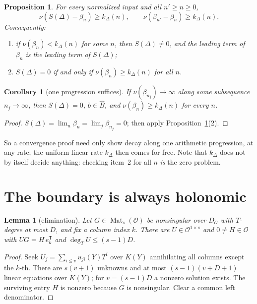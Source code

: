 \documentclass[11pt,a4paper]{article}
\newcommand{\Op}{\mathcal O}
\newcommand{\Bhat}{\widehat B}
\newcommand{\Dop}{D_{\Op}}
\newcommand{\val}{\nu}
\newcommand{\Mat}{\operatorname{Mat}}
\theoremstyle{plain}
\newtheorem{proposition}[theorem]{Proposition}
\newtheorem{lemma}[theorem]{Lemma}
\newtheorem{corollary}[theorem]{Corollary}
\theoremstyle{definition}
\theoremstyle{remark}
\begin{document}
\begin{proposition}\label{prop:rate}
For every normalized input and all $n'\ge n\ge0$,
\[
  \val(S(\Delta)-\beta_n)\ge k_\Delta(n),\qquad \val(\beta_{n'}-\beta_n)\ge k_\Delta(n).
\]
Consequently:
\begin{enumerate}
\item if $\val(\beta_n)<k_\Delta(n)$ for some $n$, then $S(\Delta)\ne0$, and the
  leading term of $\beta_n$ is the leading term of $S(\Delta)$;
\item $S(\Delta)=0$ if and only if $\val(\beta_n)\ge k_\Delta(n)$ for all $n$.
\end{enumerate}
\end{proposition}

\begin{corollary}[one progression suffices]\label{cor:progression}
If $\val(\beta_{n_j})\to\infty$ along some subsequence $n_j\to\infty$, then
$S(\Delta)=0$, $b\in\Bhat$, and $\val(\beta_n)\ge k_\Delta(n)$ for every $n$.
\end{corollary}
\begin{proof}
$S(\Delta)=\lim_n\beta_n=\lim_j\beta_{n_j}=0$; then apply Proposition~\ref{prop:rate}(2).
\end{proof}

So a convergence proof need only show decay along one arithmetic progression,
at any rate; the uniform linear rate $k_\Delta$ then comes for free. Note that
$k_\Delta$ does not by itself decide anything: checking item~2 for all $n$
\emph{is} the zero problem.

\section{The boundary is always holonomic}\label{sec:holonomic}

\begin{lemma}[elimination]\label{lem:elimination}
Let $G\in\Mat_s(\Op)$ be nonsingular over $\Dop$ with $T$-degree at most $D$, and
fix a column index $k$. There are $U\in\Op^{1\times s}$ and $0\ne H\in\Op$ with
$UG=H\,e_k^{\mathsf T}$ and $\deg_TU\le(s-1)D$.
\end{lemma}
\begin{proof}
Seek $U_j=\sum_{i\le v}u_{ji}(Y)T^i$ over $K(Y)$ annihilating all columns
except the $k$-th. There are $s(v+1)$ unknowns and at most $(s-1)(v+D+1)$ linear
equations over $K(Y)$; for $v=(s-1)D$ a nonzero solution exists. The surviving
entry $H$ is nonzero because $G$ is nonsingular. Clear a common left denominator.
\end{proof}
\end{document}
